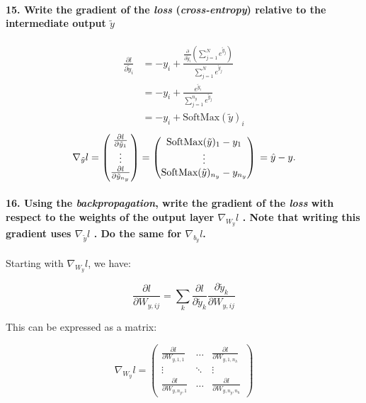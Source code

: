 \documentclass{article}
\theoremstyle{plain}%
\theoremstyle{definition}
\theoremstyle{remark}
\begin{document}
\paragraph{15. Write the gradient of the \textit{loss} (\textit{cross-entropy}) relative to the intermediate output $ \tilde{y} $ }
\begin{align*}
    \frac{\partial l}{\partial \tilde{y}_i} & = -y_i + \frac{\frac{\partial }{\partial \tilde{y}_i } (\sum_{j=1}^{N} e^{ \tilde{y}_j })}{\sum_{j=1}^{N} e^{ \tilde{y}_j }} \\
                                            & = - y_i + \frac{e^{\tilde{y}_i}}{\sum_{j=1}^{n_y} e^{ \tilde{y}_j}}                                                          \\
                                            & = - y_i + \text{SoftMax}(\tilde{y})_i
\end{align*}
\[
    \nabla _{\tilde{y}}l = \begin{pmatrix}
        \frac{\partial l}{\partial \tilde{y}_1} \\
        \vdots                                  \\
        \frac{\partial l}{\partial \tilde{y}_{n_y}}
    \end{pmatrix} = \begin{pmatrix}
        \text{SoftMax}(\tilde{y})_1 - y_1 \\
        \vdots                            \\
        \text{SoftMax}(\tilde{y})_{n_y} - y_{n_y}
    \end{pmatrix} \\
    = \hat{y} - y
    .\]

\paragraph{16. Using the \textit{backpropagation}, write the gradient of the \textit{loss} with respect to the weights of the output layer $ \nabla _{W_y}l $ . Note that writing this gradient uses $ \nabla _{\tilde{y}}l $ . Do the same for $ \nabla _{b_y}l $.}

Starting with \( \nabla _{W_y} l \), we have:

\[
    \frac{\partial l}{\partial W_{y,ij}} = \sum_{k}^{} \frac{\partial l}{\partial \tilde{y}_k} \frac{\partial \tilde{y}_k}{\partial W_{y,ij}}
\]

This can be expressed as a matrix:

\[
    \nabla_{W_y} l = \begin{pmatrix}
        \frac{\partial l}{\partial W_{y, 1,1}}   & \dots  & \frac{\partial l}{\partial W_{y, 1,n_h}}    \\
        \vdots                                   & \ddots & \vdots                                      \\
        \frac{\partial l}{\partial W_{y, n_y,1}} & \dots  & \frac{\partial l}{\partial W_{y, n_y, n_h}}
    \end{pmatrix}
\]
\end{document}
